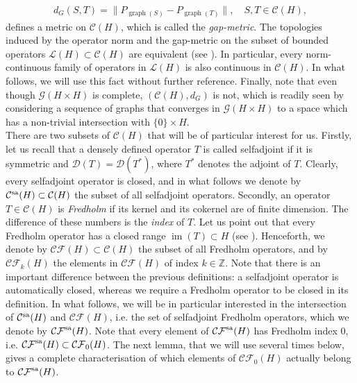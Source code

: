 \documentclass[a4paper,10pt]{article}
\DeclareMathOperator{\im}{im}
\DeclareMathOperator{\gra}{graph}
\begin{document}
\begin{align}\label{gap operators}
d_G(S,T)=\|P_{\gra(S)}-P_{\gra(T)}\|,\quad S,T\in\mathcal{C}(H),
\end{align}
defines a metric on $\mathcal{C}(H)$, which is called the \textit{gap-metric}. The topologies induced by the operator norm and the gap-metric on the subset of bounded operators $\mathcal{L}(H)\subset\mathcal{C}(H)$ are equivalent (see \cite[Rem. IV.2.16]{Kato}). In particular, every norm-continuous family of operators in $\mathcal{L}(H)$ is also continuous in $\mathcal{C}(H)$. In what follows, we will use this fact without further reference. Finally, note that even though $\mathcal{G}(H\times H)$ is complete, $(\mathcal{C}(H),d_G)$ is not, which is readily seen by considering a sequence of graphs that converges in $\mathcal{G}(H\times H)$ to a space which has a non-trivial intersection with $\{0\}\times H$.\\
There are two subsets of $\mathcal{C}(H)$ that will be of particular interest for us. Firstly, let us recall that a densely defined operator $T$ is called selfadjoint if it is symmetric and $\mathcal{D}(T)=\mathcal{D}(T^\ast)$, where $T^\ast$ denotes the adjoint of $T$. Clearly, every selfadjoint operator is closed, and in what follows we denote by $\mathcal{C}^\textup{sa}(H)\subset\mathcal{C}(H)$ the subset of all selfadjoint operators. Secondly, an operator $T\in\mathcal{C}(H)$ is \textit{Fredholm} if its kernel and its cokernel are of finite dimension. The difference of these numbers is the \textit{index} of $T$. Let us point out that every Fredholm operator has a closed range $\im(T)\subset H$ (see \cite{Gohberg}). Henceforth, we denote by $\mathcal{CF}(H)\subset\mathcal{C}(H)$ the subset of all Fredholm operators, and by $\mathcal{CF}_k(H)$ the elements in $\mathcal{CF}(H)$ of index $k\in\mathbb{Z}$. Note that there is an important difference between the previous definitions: a selfadjoint operator is automatically closed, whereas we require a Fredholm operator to be closed in its definition. In what follows, we will be in particular interested in the intersection of $\mathcal{C}^\textup{sa}(H)$ and $\mathcal{CF}(H)$, i.e. the set of selfadjoint Fredholm operators, which we denote by $\mathcal{CF}^\textup{sa}(H)$. Note that every element of $\mathcal{CF}^\textup{sa}(H)$ has Fredholm index $0$, i.e. $\mathcal{CF}^\textup{sa}(H)\subset\mathcal{CF}_0(H)$. The next lemma, that we will use several times below, gives a complete characterisation of which elements of $\mathcal{CF}_0(H)$ actually belong to $\mathcal{CF}^\textup{sa}(H)$.
 
\end{document}
